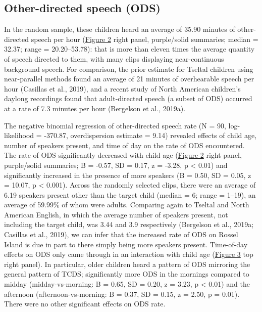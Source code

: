\documentclass[,man,floatsintext]{apa6}
\begin{document}
\subsection{Other-directed speech
(ODS)}\label{other-directed-speech-ods}

In the random sample, these children heard an average of 35.90 minutes
of other-directed speech per hour (\protect\hyperlink{fig2}{Figure 2}
right panel, purple/solid summaries; median = 32.37; range =
20.20--53.78): that is more than eleven times the average quantity of
speech directed to them, with many clips displaying near-continuous
background speech. For comparison, the prior estimate for Tseltal
children using near-parallel methods found an average of 21 minutes of
overhearable speech per hour (Casillas et al., 2019), and a recent study
of North American children's daylong recordings found that
adult-directed speech (a subset of ODS) occurred at a rate of 7.3
minutes per hour (Bergelson et al., 2019a).

The negative binomial regression of other-directed speech rate (N = 90,
log-likelihood = -370.87, overdispersion estimate = 9.14) revealed
effects of child age, number of speakers present, and time of day on the
rate of ODS encountered. The rate of ODS significantly decreased with
child age (\protect\hyperlink{fig2}{Figure 2} right panel, purple/solid
summaries; B = -0.57, SD = 0.17, z = -3.28, p \textless{} 0.01) and
significantly increased in the presence of more speakers (B = 0.50, SD =
0.05, z = 10.07, p \textless{} 0.001). Across the randomly selected
clips, there were an average of 6.19 speakers present other than the
target child (median = 6; range = 1--19), an average of 59.99\% of whom
were adults. Comparing again to Tseltal and North American English, in
which the average number of speakers present, not including the target
child, was 3.44 and 3.9 respectively (Bergelson et al., 2019a; Casillas
et al., 2019), we can infer that the increased rate of ODS on Rossel
Island is due in part to there simply being more speakers present.
Time-of-day effects on ODS only came through in an interaction with
child age (\protect\hyperlink{fig3}{Figure 3} top right panel). In
particular, older children heard a pattern of ODS mirroring the general
pattern of TCDS; significantly more ODS in the mornings compared to
midday (midday-vs-morning: B = 0.65, SD = 0.20, z = 3.23, p \textless{}
0.01) and the afternoon (afternoon-vs-morning: B = 0.37, SD = 0.15, z =
2.50, p = 0.01). There were no other significant effects on ODS rate.
\end{document}
